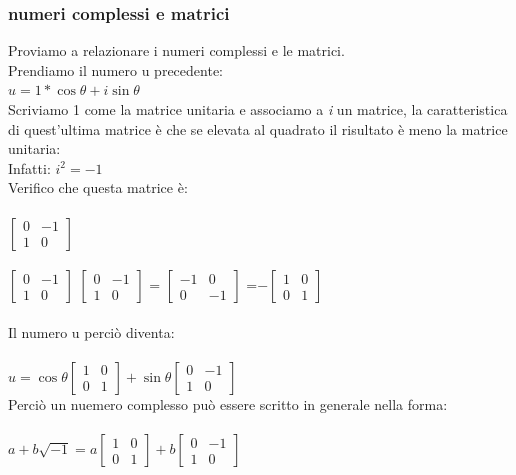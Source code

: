 \documentclass[a4paper]{article}
\begin{document}
\subsubsection{numeri complessi e matrici}
Proviamo a relazionare i numeri complessi e le matrici.
\\Prendiamo il numero u precedente:
\\$u=1*\cos\theta+\textit{i}\sin\theta
$
\\Scriviamo 1 come la matrice unitaria e associamo a \textit{i} un matrice, la caratteristica di quest'ultima matrice è che se elevata al quadrato il risultato è meno la matrice unitaria:
\\Infatti: $\textit{i}^2=-1$
\\Verifico che questa matrice è:
\\
\\$\left[\begin{matrix}0&-1\\ 1&0 \end{matrix}\right]
$
\\
\\$\left[\begin{matrix}0&-1\\ 1&0 \end{matrix}\right]
$
$\left[\begin{matrix}0&-1\\ 1&0 \end{matrix}\right]
$
= $\left[\begin{matrix}-1&0 \\ 0&-1 \end{matrix}\right]
$
=$-\left[\begin{matrix}1&0 \\ 0&1 \end{matrix}\right]
$
\\
\\
Il numero u perciò diventa:
\\
\\$u=\cos\theta\left[\begin{matrix}1&0 \\ 0&1 \end{matrix}\right]+\sin\theta\left[\begin{matrix}0&-1\\ 1&0 \end{matrix}\right]
$
\\Perciò un nuemero complesso può essere scritto in generale nella forma:
\\
\\ $a+b\sqrt{-1}=a \left[\begin{matrix}1&0 \\ 0&1 \end{matrix}\right]+ b\left[\begin{matrix}0&-1\\ 1&0 \end{matrix}\right]
$
\end{document}
